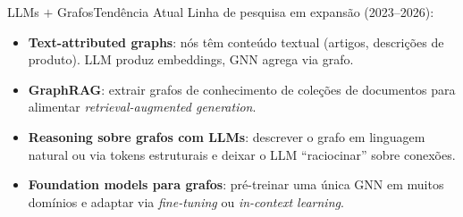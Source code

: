 \documentclass[aspectratio=169,xcolor=dvipsnames]{beamer}
\begin{document}
  \begin{frame}{LLMs $+$ Grafos}{Tendência Atual}
    Linha de pesquisa em expansão (2023--2026):

    \vspace{0.4em}
    \begin{itemize}
      \item \textbf{Text-attributed graphs}: nós têm conteúdo textual (artigos,
            descrições de produto). LLM produz embeddings, GNN agrega via grafo.
      \item \textbf{GraphRAG}: extrair grafos de conhecimento de coleções de
            documentos para alimentar \textit{retrieval-augmented generation}.
      \item \textbf{Reasoning sobre grafos com LLMs}: descrever o grafo em
            linguagem natural ou via tokens estruturais e deixar o LLM
            \enquote{raciocinar} sobre conexões.
      \item \textbf{Foundation models para grafos}: pré-treinar uma única GNN
            em muitos domínios e adaptar via \textit{fine-tuning} ou
            \textit{in-context learning}.
    \end{itemize}

  \end{frame}
\end{document}
